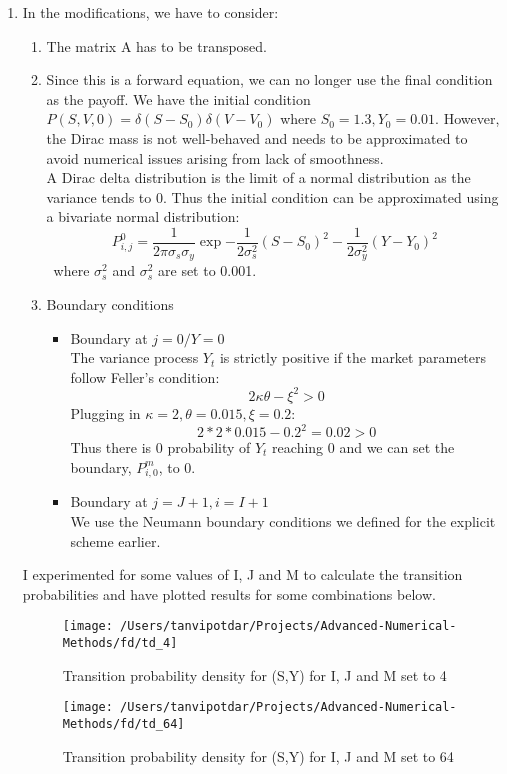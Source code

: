 \documentclass{article}
\begin{document}
\begin{enumerate}
\item In the modifications, we have to consider:
\begin{enumerate}
\item The matrix A has to be transposed.
\item Since this is a forward equation, we can no longer use the final condition as the payoff. We have the initial condition $P(S,V,0) = \delta(S-S_0)\delta(V-V_0)$ where $S_0=1.3, Y_0=0.01$. However, the Dirac mass is not well-behaved and needs to be approximated to avoid numerical issues arising from lack of smoothness. \\
A Dirac delta distribution is the limit of a normal distribution as the variance tends to 0. Thus the initial condition can be approximated using a bivariate normal distribution:
\[P^0_{i,j} = \frac{1}{2\pi\sigma_s\sigma_y}\exp{-\frac{1}{2\sigma^2_s}(S-S_0)^2 - \frac{1}{2\sigma^2_y}(Y-Y_0)^2}\]\
 where $\sigma^2_s$ and $\sigma^2_s$ are set to 0.001.
\item Boundary conditions 
\begin{itemize}
\item Boundary at $j=0/Y=0$\\
The variance process $Y_t$ is strictly positive if the market parameters follow Feller's condition:
\[2\kappa\theta - \xi^2 >0\]
Plugging in $\kappa = 2, \theta=0.015, \xi=0.2$:
\[2*2*0.015 - 0.2^2 = 0.02 > 0\]
Thus there is 0 probability of $Y_t$ reaching 0 and we can set the boundary, $P^m_{i,0}$, to 0.\\
\item Boundary at $j=J+1, i=I+1$\\
We use the Neumann boundary conditions we defined for the explicit scheme earlier. 
\end{itemize}
\end{enumerate}
I experimented for some values of I, J and M to calculate the transition probabilities and have plotted results for some combinations below.
\begin{figure}[!htbp]
    \centering
    \hspace*{-2cm}
    \texttt{[image: /Users/tanvipotdar/Projects/Advanced-Numerical-Methods/fd/td\_4]}
    \caption{Transition probability density for (S,Y) for I, J and M set to 4}
 \end{figure}

\begin{figure}[!htbp]
    \centering
    \hspace*{-2cm}
    \texttt{[image: /Users/tanvipotdar/Projects/Advanced-Numerical-Methods/fd/td\_64]}
    \caption{Transition probability density for (S,Y) for I, J and M set to 64}
\end{figure}


\end{enumerate}
\end{document}
